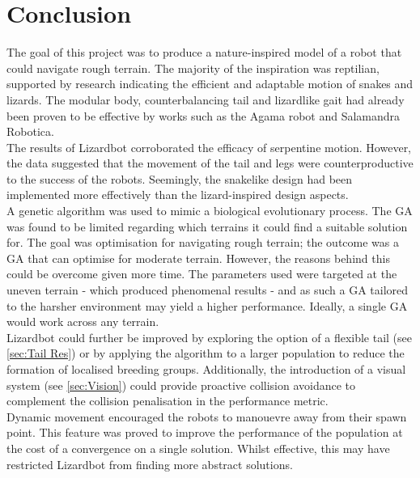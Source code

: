 \documentclass{article}
\begin{document}
\newpage
\section{Conclusion}
\label{sec:Conclusion}

The goal of this project was to produce a nature-inspired model of a robot that could navigate rough terrain. The majority of the inspiration was reptilian, supported by research indicating the efficient and adaptable motion of snakes and lizards. The modular body, counterbalancing tail and lizardlike gait had already been proven to be effective by works such as the Agama robot and Salamandra Robotica. \\

The results of Lizardbot corroborated the efficacy of serpentine motion. However, the data suggested that the movement of the tail and legs were counterproductive to the success of the robots. Seemingly, the snakelike design had been implemented more effectively than the lizard-inspired design aspects.\\ 

A genetic algorithm was used to mimic a biological evolutionary process. The GA was found to be limited regarding which terrains it could find a suitable solution for. The goal was optimisation for navigating rough terrain; the outcome was a GA that can optimise for moderate terrain. However, the reasons behind this could be overcome given more time. The parameters used were targeted at the uneven terrain - which produced phenomenal results - and as such a GA tailored to the harsher environment may yield a higher performance. Ideally, a single GA would work across any terrain.\\
Lizardbot could further be improved by exploring the option of a flexible tail (see \ref{sec:Tail Res}) or by applying the algorithm to a larger population to reduce the formation of localised breeding groups. Additionally, the introduction of a visual system (see \ref{sec:Vision}) could provide proactive collision avoidance to complement the collision penalisation in the performance metric. \\

Dynamic movement encouraged the robots to manouevre away from their spawn point. This feature was proved to improve the performance of the population at the cost of a convergence on a single solution. Whilst effective, this may have restricted Lizardbot from finding more abstract solutions. \\
\end{document}
